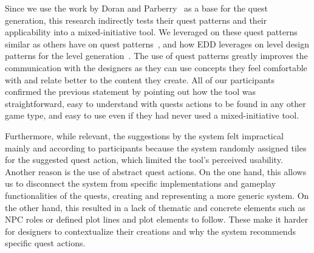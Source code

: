 Since we use the work by Doran and Parberry~\cite{p8Doran2011-questsMMORPGs} as a base for the quest generation, this research indirectly tests their quest patterns and their applicability into a mixed-initiative tool. We leveraged on these quest patterns similar as others have on quest patterns~\cite{p8Trenton2010-questpatterns,Smith2011-situatingQuests}, and how EDD leverages on level design patterns for the level generation~\cite{p8Baldwin2017,alvarez2019empowering}. The use of quest patterns greatly improves the communication with the designers as they can use concepts they feel comfortable with and relate better to the content they create. All of our participants confirmed the previous statement by pointing out how the tool was straightforward, easy to understand with quests actions to be found in any other game type, and easy to use even if they had never used a mixed-initiative tool.


Furthermore, while relevant, the suggestions by the system felt impractical mainly and according to participants because the system randomly assigned tiles for the suggested quest action, which limited the tool's perceived usability. Another reason is the use of abstract quest actions. On the one hand, this allows us to disconnect the system from specific implementations and gameplay functionalities of the quests, creating and representing a more generic system. On the other hand, this resulted in a lack of thematic and concrete elements such as NPC roles or defined plot lines and plot elements to follow. These make it harder for designers to contextualize their creations and why the system recommends specific quest actions. %


